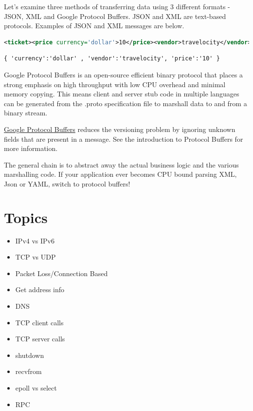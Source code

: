 Let's examine three methods of transferring data using 3 different formats - JSON, XML and Google Protocol Buffers.
JSON and XML are text-based protocols.
Examples of JSON and XML messages are below.

\begin{lstlisting}[language=XML]
<ticket><price currency='dollar'>10</price><vendor>travelocity</vendor></ticket>
\end{lstlisting}

\begin{lstlisting}
{ 'currency':'dollar' , 'vendor':'travelocity', 'price':'10' }
\end{lstlisting}

Google Protocol Buffers is an open-source efficient binary protocol that places a strong emphasis on high throughput with low CPU overhead and minimal memory copying.
This means client and server stub code in multiple languages can be generated from the .proto specification file to marshall data to and from a binary stream.

\href{https://developers.google.com/protocol-buffers/docs/overview}{Google Protocol Buffers} reduces the versioning problem by ignoring unknown fields that are present in a message.
See the introduction to Protocol Buffers for more information.

The general chain is to abstract away the actual business logic and the various marshalling code.
If your application ever becomes CPU bound parsing XML, Json or YAML, switch to protocol buffers!

\section{Topics}

\begin{itemize}
\item
  IPv4 vs IPv6
\item
  TCP vs UDP
\item
  Packet Loss/Connection Based
\item
  Get address info
\item
  DNS
\item
  TCP client calls
\item
  TCP server calls
\item
  shutdown
\item
  recvfrom
\item
  epoll vs select
\item
  RPC
\end{itemize}

